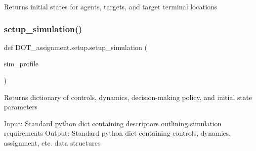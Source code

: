 \begin{DoxyVerb}Returns initial states for agents, targets, and target terminal locations\end{DoxyVerb}
 \mbox{\label{namespace_d_o_t__assignment_1_1setup_ab207d233471df2264b7906939e447e2f}} 
\subsubsection{\texorpdfstring{setup\_simulation()}{setup\_simulation()}}
{\footnotesize\ttfamily def D\+O\+T\+\_\+assignment.\+setup.\+setup\+\_\+simulation (\begin{DoxyParamCaption}\item[{}]{sim\+\_\+profile }\end{DoxyParamCaption})}

\begin{DoxyVerb}Returns dictionary of controls, dynamics, decision-making policy, and initial state parameters

Input: Standard python dict containing descriptors outlining simulation requirements
Output: Standard python dict containing controls, dynamics, assignment, etc. data structures\end{DoxyVerb}
 